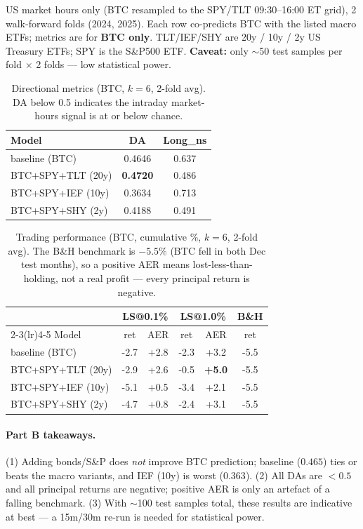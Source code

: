 \documentclass[11pt]{article}
\newcommand{\bb}[1]{\textcolor{best}{\textbf{#1}}}
\begin{document}
US market hours only (BTC resampled to the SPY/TLT 09:30--16:00 ET grid), 2
walk-forward folds (2024, 2025). Each row co-predicts BTC with the listed macro
ETFs; metrics are for \textbf{BTC only}. TLT/IEF/SHY are 20y / 10y / 2y US
Treasury ETFs; SPY is the S\&P500 ETF. \textbf{Caveat:} only $\sim$50 test
samples per fold $\times$ 2 folds --- low statistical power.

\begin{table}[h]\centering
\caption{Directional metrics (BTC, $k{=}6$, 2-fold avg). DA below 0.5 indicates
the intraday market-hours signal is at or below chance.}
\label{tab:macro-dir}
\begin{tabular}{lcc}
\toprule
Model & DA & Long\_ns \\
\midrule
baseline (BTC)    & 0.4646 & 0.637 \\
BTC+SPY+TLT (20y) & \bb{0.4720} & 0.486 \\
BTC+SPY+IEF (10y) & 0.3634 & 0.713 \\
BTC+SPY+SHY (2y)  & 0.4188 & 0.491 \\
\bottomrule
\end{tabular}
\end{table}

\begin{table}[h]\centering
\caption{Trading performance (BTC, cumulative \%, $k{=}6$, 2-fold avg). The B\&H
benchmark is $-5.5\%$ (BTC fell in both Dec test months), so a positive AER means
lost-less-than-holding, not a real profit --- every principal return is negative.}
\label{tab:macro-strat}
\begin{tabular}{lccccc}
\toprule
 & \multicolumn{2}{c}{LS@0.1\%} & \multicolumn{2}{c}{LS@1.0\%} & B\&H \\
\cmidrule(lr){2-3}\cmidrule(lr){4-5}
Model & ret & AER & ret & AER & ret \\
\midrule
baseline (BTC)    & -2.7 & +2.8 & -2.3 & +3.2 & -5.5 \\
BTC+SPY+TLT (20y) & -2.9 & +2.6 & -0.5 & \bb{+5.0} & -5.5 \\
BTC+SPY+IEF (10y) & -5.1 & +0.5 & -3.4 & +2.1 & -5.5 \\
BTC+SPY+SHY (2y)  & -4.7 & +0.8 & -2.4 & +3.1 & -5.5 \\
\bottomrule
\end{tabular}
\end{table}

\paragraph{Part B takeaways.}
(1) Adding bonds/S\&P does \emph{not} improve BTC prediction; baseline ($0.465$)
ties or beats the macro variants, and IEF (10y) is worst ($0.363$).
(2) All DAs are $<0.5$ and all principal returns are negative; positive AER is
only an artefact of a falling benchmark.
(3) With $\sim$100 test samples total, these results are indicative at best --- a
15m/30m re-run is needed for statistical power.
\end{document}
